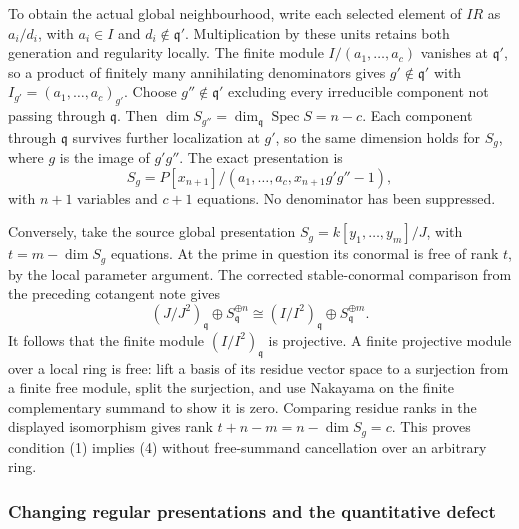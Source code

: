 To obtain the actual global neighbourhood, write each selected element of \(IR\) as \(a_i/d_i\), with \(a_i\in I\) and \(d_i\notin\mathfrak q'\). Multiplication by these units retains both generation and regularity locally. The finite module \(I/(a_1,\ldots,a_c)\) vanishes at \(\mathfrak q'\), so a product of finitely many annihilating denominators gives \(g'\notin\mathfrak q'\) with \(I_{g'}=(a_1,\ldots,a_c)_{g'}\). Choose \(g''\notin\mathfrak q'\) excluding every irreducible component not passing through \(\mathfrak q\). Then \(\dim S_{g''}=\dim_{\mathfrak q}\operatorname{Spec}S=n-c\). Each component through \(\mathfrak q\) survives further localization at \(g'\), so the same dimension holds for \(S_g\), where \(g\) is the image of \(g'g''\). The exact presentation is \[
S_g=P[x_{n+1}]/(a_1,\ldots,a_c,x_{n+1}g'g''-1),
\] with \(n+1\) variables and \(c+1\) equations. No denominator has been suppressed.

Conversely, take the source global presentation \(S_g=k[y_1,\ldots,y_m]/J\), with \(t=m-\dim S_g\) equations. At the prime in question its conormal is free of rank \(t\), by the local parameter argument. The corrected stable-conormal comparison from the preceding cotangent note gives \[
(J/J^2)_{\mathfrak q}\oplus S_{\mathfrak q}^{\oplus n}
\cong (I/I^2)_{\mathfrak q}\oplus S_{\mathfrak q}^{\oplus m}.
\] It follows that the finite module \((I/I^2)_{\mathfrak q}\) is projective. A finite projective module over a local ring is free: lift a basis of its residue vector space to a surjection from a finite free module, split the surjection, and use Nakayama on the finite complementary summand to show it is zero. Comparing residue ranks in the displayed isomorphism gives rank \(t+n-m=n-\dim S_g=c\). This proves condition (1) implies (4) without free-summand cancellation over an arbitrary ring.

\subsubsection{Changing regular presentations and the quantitative defect}\label{algebra-proof-045-changing-regular-presentations-and-the-quantitative-defect}

